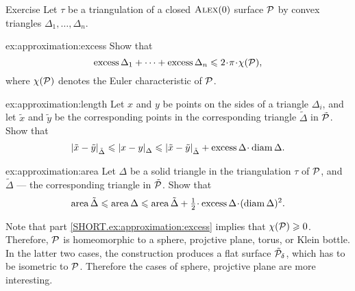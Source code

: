 \begin{thm}{Exercise}\label{ex:approximation}
Let $\tau$ be a triangulation of a closed $\textsc{Alex}(0)$ surface $\mathcal{P}$ by convex triangles $\Delta_1,\dots,\Delta_n$.




\begin{subthm}{ex:approximation:excess}
Show that
\[\excess\Delta_1+\dots+\excess\Delta_n \le 2\cdot\pi\cdot \chi(\spc{P}),\]
where $\chi(\mathcal{P})$ denotes the Euler characteristic of $\mathcal{P}$.
\end{subthm}


\begin{subthm}{ex:approximation:length}
Let $x$ and $y$ be points on the sides of a triangle $\Delta_i$, and let $\tilde x$ and $\tilde y$ be the corresponding points in the corresponding triangle $\tilde \Delta$ in $\tilde{\mathcal{P}}$.
Show that
\[\dist{\tilde x}{\tilde y}{\tilde \Delta}\le\dist{x}{y}{\Delta}\le \dist{\tilde x}{\tilde y}{\tilde \Delta}+\excess\Delta\cdot \diam \Delta.\]

\end{subthm}

\begin{subthm}{ex:approximation:area}
Let $\Delta$ be a solid triangle in the triangulation $\tau$ of $\mathcal{P}$, and $\tilde \Delta$ --- the corresponding triangle in $\tilde{\mathcal{P}}$.
Show that
\[\area \tilde \Delta\le \area \Delta\le \area \tilde \Delta+\tfrac12\cdot\excess\Delta\cdot (\diam \Delta)^2.\]

\end{subthm}

\end{thm}

Note that part \ref{SHORT.ex:approximation:excess} implies that $\chi(\mathcal{P})\geqslant 0$.
Therefore, $\mathcal{P}$ is homeomorphic to a sphere, projctive plane, torus, or Klein bottle.
In the latter two cases, the construction produces a flat surface $\tilde{\mathcal{P}}_\delta$, which has to be isometric to $\mathcal{P}$.
Therefore the cases of sphere, projctive plane are more interesting.

